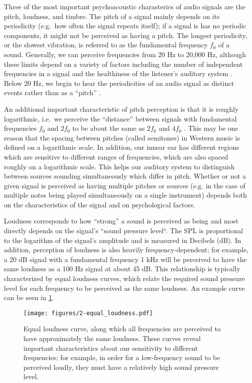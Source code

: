 Three of the most important psychoacoustic charasterics of audio signals are the pitch, loudness, and timbre.
The pitch of a signal mainly depends on its periodicity (e.g.\ how often the signal repeats itself); if a signal is has no periodic components, it might not be perceived as having a pitch.
The longest periodicity, or the slowest vibration, is referred to as the fundamental frequency $f_0$ of a sound.
Generally, we can perceive frequencies from 20 Hz to 20,000 Hz, although these limits depend on a variety of factors including the number of independent frequencies in a signal and the healthiness of the listener's auditory system \cite{}.
Below 20 Hz, we begin to hear the periodicities of an audio signal as distinct events rather than as a ``pitch'' \cite{}.

An additional important characteristic of pitch perception is that it is roughly logarithmic, i.e.\ we perceive the ``distance'' between signals with fundamental frequencies $f_0$ and $2f_0$ to be about the same as $2f_0$ and $4f_0$ \cite{}.
This may be one reason that the spacing between pitches (called semitones) in Western music is defined on a logarithmic scale.
In addition, our innear ear has different regions which are sensitive to different ranges of frequencies, which are also spaced roughly on a logarithmic scale.
This helps our auditory system to distinguish between sources sounding simultaneously which differ in pitch.
Whether or not a given signal is perceived as having multiple pitches or sources (e.g. in the case of multiple notes being played simultaneously on a single instrument) depends both on the characteristics of the signal and on psychological factors.

Loudness corresponds to how ``strong'' a sound is perceived as being and most directly depends on the signal's ``sound pressure level``.
The SPL is proportional to the logarithm of the signal's amplitude and is measured in Decibels (dB).
In addition, perception of loudness is also heavily frequency-dependent; for example, a 20 dB signal with a fundamental frequency 1 kHz will be perceived to have the same loudness as a 100 Hz signal at about 45 dB.
This relationship is typically characterized by equal loudness curves, which relate the required sound pressure level for each frequency to be perceived as the same loudness.
An example curve can be seen in \cref{fig:equal_loudness}.

\begin{figure}
  \centering
  \texttt{[image: figures/2-equal\_loudness.pdf]}
  \caption[Equal loudness curve]{Equal loudness curve, along which all frequencies are perceived to have approximately the same loudness.
  These curves reveal important characteristics about our sensitivity to different frequencies; for example, in order for a low-frequency sound to be perceived loudly, they must have a relatively high sound pressure level.}
  \label{fig:equal_loudness}
\end{figure}

